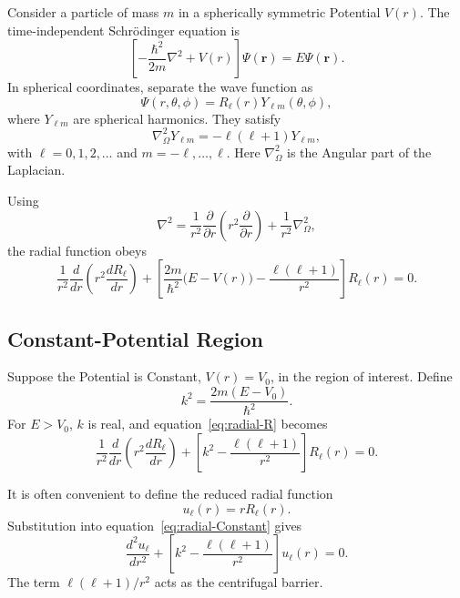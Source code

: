 \documentclass[a4paper, 10pt, onepage]{elegantbook}
\begin{document}
{Consider a particle of mass $m$ in a spherically symmetric Potential
$V(r)$. The time-independent Schr\"odinger equation is
\begin{equation}
  \left[-\frac{\hbar^2}{2m}\nabla^2+V(r)\right]\Psi(\mathbf r)
  =E\Psi(\mathbf r).
\end{equation}
In spherical coordinates, separate the wave function as
\begin{equation}
  \Psi(r,\theta,\phi)=R_\ell(r)Y_{\ell m}(\theta,\phi),
\end{equation}
where $Y_{\ell m}$ are spherical harmonics. They satisfy
\begin{equation}
  \nabla^2_{\Omega}Y_{\ell m}
  =-\ell(\ell+1)Y_{\ell m},
\end{equation}
with $\ell=0,1,2,\ldots$ and $m=-\ell,\ldots,\ell$. Here
$\nabla^2_{\Omega}$ is the Angular part of the Laplacian.

Using
\begin{equation}
  \nabla^2
  =\frac{1}{r^2}\frac{\partial}{\partial r}
       \left(r^2\frac{\partial}{\partial r}\right)
   +\frac{1}{r^2}\nabla^2_{\Omega},
\end{equation}
the radial function obeys
\begin{equation}
  \frac{1}{r^2}\frac{d}{dr}
       \left(r^2\frac{dR_\ell}{dr}\right)
  +\left[
       \frac{2m}{\hbar^2}\bigl(E-V(r)\bigr)
       -\frac{\ell(\ell+1)}{r^2}
   \right]R_\ell(r)=0.
  \label{eq:radial-R}
\end{equation}

\subsection{Constant-Potential Region}

\noindent

Suppose the Potential is Constant, $V(r)=V_0$, in the region of
interest. Define
\begin{equation}
  k^2=\frac{2m(E-V_0)}{\hbar^2}.
\end{equation}
For $E>V_0$, $k$ is real, and equation~\eqref{eq:radial-R} becomes
\begin{equation}
  \frac{1}{r^2}\frac{d}{dr}
       \left(r^2\frac{dR_\ell}{dr}\right)
  +\left[k^2-\frac{\ell(\ell+1)}{r^2}\right]R_\ell(r)=0.
  \label{eq:radial-Constant}
\end{equation}

It is often convenient to define the reduced radial function
\begin{equation}
  u_\ell(r)=rR_\ell(r).
\end{equation}
Substitution into equation~\eqref{eq:radial-Constant} gives
\begin{equation}
  \frac{d^2u_\ell}{dr^2}
  +\left[k^2-\frac{\ell(\ell+1)}{r^2}\right]u_\ell(r)=0.
  \label{eq:reduced-radial}
\end{equation}
The term $\ell(\ell+1)/r^2$ acts as the centrifugal barrier.

}
\end{document}
